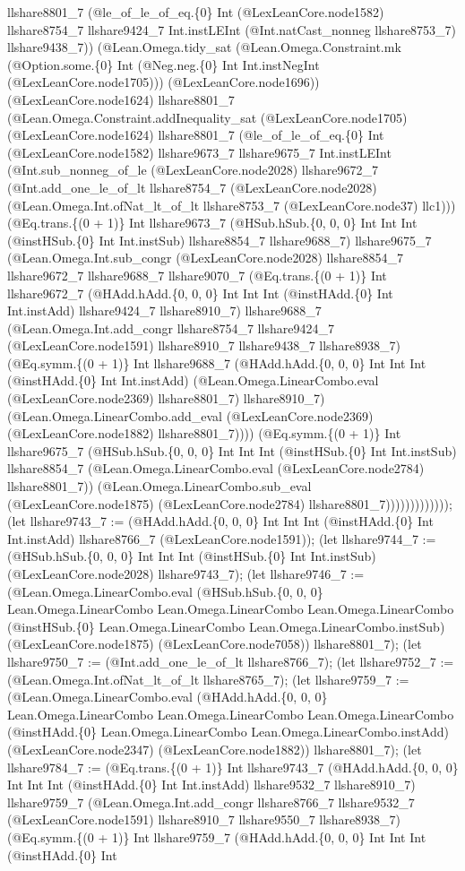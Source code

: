 \documentclass[11pt]{article}
\begin{document}
llshare8801\_7 (@le\_of\_le\_of\_eq.\{0\} Int (@LexLeanCore.node1582) llshare8754\_7 llshare9424\_7 Int.instLEInt (@Int.natCast\_nonneg llshare8753\_7) llshare9438\_7)) (@Lean.Omega.tidy\_sat (@Lean.Omega.Constraint.mk (@Option.some.\{0\} Int (@Neg.neg.\{0\} Int Int.instNegInt (@LexLeanCore.node1705))) (@LexLeanCore.node1696)) (@LexLeanCore.node1624) llshare8801\_7 (@Lean.Omega.Constraint.addInequality\_sat (@LexLeanCore.node1705) (@LexLeanCore.node1624) llshare8801\_7 (@le\_of\_le\_of\_eq.\{0\} Int (@LexLeanCore.node1582) llshare9673\_7 llshare9675\_7 Int.instLEInt (@Int.sub\_nonneg\_of\_le (@LexLeanCore.node2028) llshare9672\_7 (@Int.add\_one\_le\_of\_lt llshare8754\_7 (@LexLeanCore.node2028) (@Lean.Omega.Int.ofNat\_lt\_of\_lt llshare8753\_7 (@LexLeanCore.node37) llc1))) (@Eq.trans.\{(0 + 1)\} Int llshare9673\_7 (@HSub.hSub.\{0, 0, 0\} Int Int Int (@instHSub.\{0\} Int Int.instSub) llshare8854\_7 llshare9688\_7) llshare9675\_7 (@Lean.Omega.Int.sub\_congr (@LexLeanCore.node2028) llshare8854\_7 llshare9672\_7 llshare9688\_7 llshare9070\_7 (@Eq.trans.\{(0 + 1)\} Int llshare9672\_7 (@HAdd.hAdd.\{0, 0, 0\} Int Int Int (@instHAdd.\{0\} Int Int.instAdd) llshare9424\_7 llshare8910\_7) llshare9688\_7 (@Lean.Omega.Int.add\_congr llshare8754\_7 llshare9424\_7 (@LexLeanCore.node1591) llshare8910\_7 llshare9438\_7 llshare8938\_7) (@Eq.symm.\{(0 + 1)\} Int llshare9688\_7 (@HAdd.hAdd.\{0, 0, 0\} Int Int Int (@instHAdd.\{0\} Int Int.instAdd) (@Lean.Omega.LinearCombo.eval (@LexLeanCore.node2369) llshare8801\_7) llshare8910\_7) (@Lean.Omega.LinearCombo.add\_eval (@LexLeanCore.node2369) (@LexLeanCore.node1882) llshare8801\_7)))) (@Eq.symm.\{(0 + 1)\} Int llshare9675\_7 (@HSub.hSub.\{0, 0, 0\} Int Int Int (@instHSub.\{0\} Int Int.instSub) llshare8854\_7 (@Lean.Omega.LinearCombo.eval (@LexLeanCore.node2784) llshare8801\_7)) (@Lean.Omega.LinearCombo.sub\_eval (@LexLeanCore.node1875) (@LexLeanCore.node2784) llshare8801\_7))))))))))))); (let llshare9743\_7 := (@HAdd.hAdd.\{0, 0, 0\} Int Int Int (@instHAdd.\{0\} Int Int.instAdd) llshare8766\_7 (@LexLeanCore.node1591)); (let llshare9744\_7 := (@HSub.hSub.\{0, 0, 0\} Int Int Int (@instHSub.\{0\} Int Int.instSub) (@LexLeanCore.node2028) llshare9743\_7); (let llshare9746\_7 := (@Lean.Omega.LinearCombo.eval (@HSub.hSub.\{0, 0, 0\} Lean.Omega.LinearCombo Lean.Omega.LinearCombo Lean.Omega.LinearCombo (@instHSub.\{0\} Lean.Omega.LinearCombo Lean.Omega.LinearCombo.instSub) (@LexLeanCore.node1875) (@LexLeanCore.node7058)) llshare8801\_7); (let llshare9750\_7 := (@Int.add\_one\_le\_of\_lt llshare8766\_7); (let llshare9752\_7 := (@Lean.Omega.Int.ofNat\_lt\_of\_lt llshare8765\_7); (let llshare9759\_7 := (@Lean.Omega.LinearCombo.eval (@HAdd.hAdd.\{0, 0, 0\} Lean.Omega.LinearCombo Lean.Omega.LinearCombo Lean.Omega.LinearCombo (@instHAdd.\{0\} Lean.Omega.LinearCombo Lean.Omega.LinearCombo.instAdd) (@LexLeanCore.node2347) (@LexLeanCore.node1882)) llshare8801\_7); (let llshare9784\_7 := (@Eq.trans.\{(0 + 1)\} Int llshare9743\_7 (@HAdd.hAdd.\{0, 0, 0\} Int Int Int (@instHAdd.\{0\} Int Int.instAdd) llshare9532\_7 llshare8910\_7) llshare9759\_7 (@Lean.Omega.Int.add\_congr llshare8766\_7 llshare9532\_7 (@LexLeanCore.node1591) llshare8910\_7 llshare9550\_7 llshare8938\_7) (@Eq.symm.\{(0 + 1)\} Int llshare9759\_7 (@HAdd.hAdd.\{0, 0, 0\} Int Int Int (@instHAdd.\{0\} Int 
\end{document}
